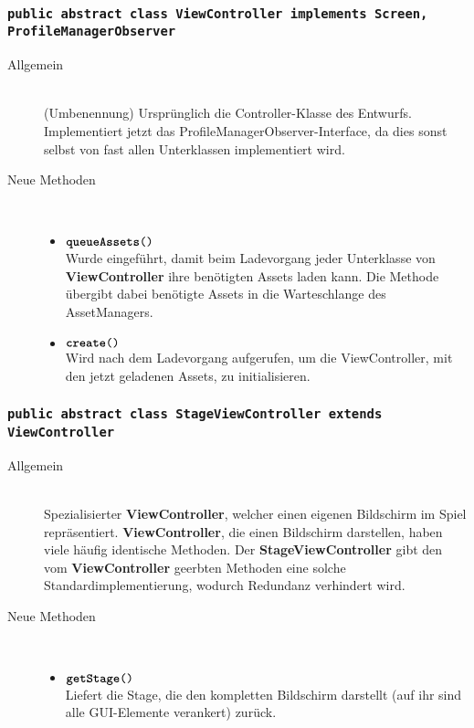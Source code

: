 \subsubsection{\normalfont \texttt{public abstract class \textbf{ViewController} implements Screen, ProfileManagerObserver}}

\begin{description}
\item[Allgemein] \hfill \\ (Umbenennung) Ursprünglich die Controller-Klasse des Entwurfs. Implementiert jetzt das ProfileManagerObserver-Interface, da dies sonst selbst von fast allen Unterklassen implementiert wird.
	
\item[Neue Methoden] \hfill \\
	\vspace{-.8cm}
	\begin{itemize}
		\item $\texttt{\textbf{queueAssets}()}$ \\ Wurde eingeführt, damit beim Ladevorgang jeder Unterklasse von \textbf{ViewController} ihre benötigten Assets laden kann. Die Methode übergibt dabei benötigte Assets in die Warteschlange des AssetManagers.
		\item $\texttt{\textbf{create}()}$ \\ Wird nach dem Ladevorgang aufgerufen, um die ViewController, mit den jetzt geladenen Assets, zu initialisieren.
	\end{itemize}
\end{description}

\subsubsection{\normalfont \texttt{public abstract class \textbf{StageViewController} extends ViewController}}

\begin{description}
\item[Allgemein] \hfill \\ Spezialisierter \textbf{ViewController}, welcher einen eigenen Bildschirm im Spiel repräsentiert. \textbf{ViewController}, die einen Bildschirm darstellen, haben viele häufig identische Methoden. Der \textbf{StageViewController} gibt den vom \textbf{ViewController} geerbten Methoden eine solche Standardimplementierung, wodurch Redundanz verhindert wird.

\item[Neue Methoden] \hfill \\
	\vspace{-.8cm}
	\begin{itemize}
		\item $\texttt{\textbf{getStage}()}$ \\ Liefert die Stage, die den kompletten Bildschirm darstellt (auf ihr sind alle GUI-Elemente verankert) zurück.
	\end{itemize}
\end{description}